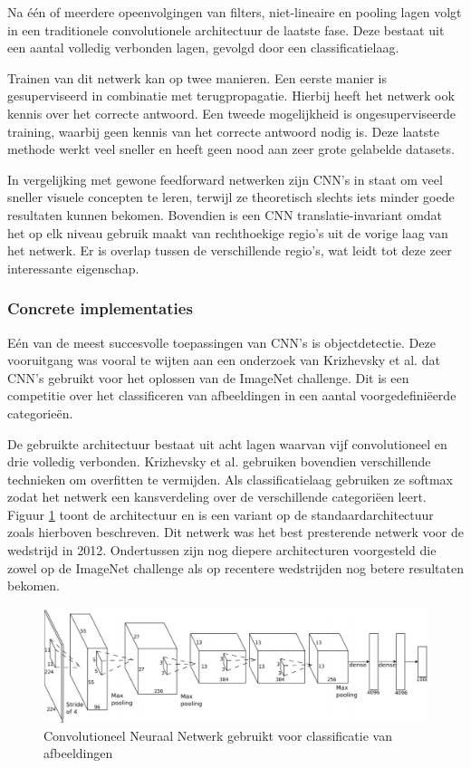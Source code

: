 Na \'e\'en of meerdere opeenvolgingen van filters, niet-lineaire en pooling lagen volgt in een traditionele convolutionele architectuur de laatste fase. Deze bestaat uit een aantal volledig verbonden lagen, gevolgd door een classificatielaag.

Trainen van dit netwerk kan op twee manieren. Een eerste manier is gesuperviseerd in combinatie met terugpropagatie. Hierbij heeft het netwerk ook kennis over het correcte antwoord. Een tweede mogelijkheid is ongesuperviseerde training, waarbij geen kennis van het correcte antwoord nodig is. Deze laatste methode werkt veel sneller en heeft geen nood aan zeer grote gelabelde datasets. 

In vergelijking met gewone feedforward netwerken zijn CNN's in staat om veel sneller visuele concepten te leren, terwijl ze theoretisch slechts iets minder goede resultaten kunnen bekomen.
Bovendien is een CNN translatie-invariant omdat het op elk niveau gebruik maakt van rechthoekige regio's uit de vorige laag van het netwerk. Er is overlap tussen de verschillende regio's, wat leidt tot deze zeer interessante eigenschap.

\subsubsection[]{Concrete implementaties}
E\'en van de meest succesvolle toepassingen van CNN's is objectdetectie. Deze vooruitgang was vooral te wijten aan een onderzoek van Krizhevsky et al.\cite{Krizhevsky2012a} dat CNN's gebruikt voor het oplossen van de ImageNet challenge\cite{Russakovsky2014}.
Dit is een competitie over het classificeren van afbeeldingen in een aantal voorgedefini\"eerde categorie\"en. 

De gebruikte architectuur bestaat uit acht lagen waarvan vijf convolutioneel en drie volledig verbonden. Krizhevsky et al. gebruiken bovendien verschillende technieken om overfitten te vermijden. Als classificatielaag gebruiken ze softmax zodat het netwerk een kansverdeling over de verschillende categori\"een leert. Figuur \ref{fig:AlexNet} toont de architectuur en  is een variant op de standaardarchitectuur zoals hierboven beschreven. Dit netwerk was het best presterende netwerk voor de wedstrijd in 2012. Ondertussen zijn nog diepere architecturen voorgesteld die zowel op de ImageNet challenge als op recentere wedstrijden nog betere resultaten bekomen.

\begin{figure}[tb]
	\centering
	\includegraphics[width=\linewidth]{Images/cnn.PNG}
	\caption{Convolutioneel Neuraal Netwerk gebruikt voor classificatie van afbeeldingen\cite{Krizhevsky2012a}}
	\label{fig:AlexNet}
\end{figure}

